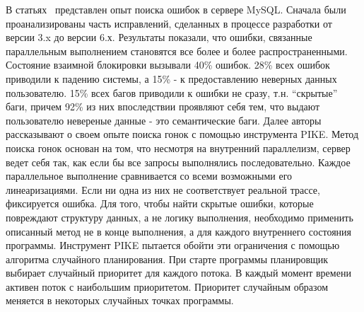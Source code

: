 В статьях~\cite{Fonseca:2010,Fonseca:2011} представлен опыт поиска ошибок в сервере MySQL.
Сначала были проанализированы часть исправлений, сделанных в процессе разработки от версии 3.x до версии 6.х.
Результаты показали, что ошибки, связанные параллельным выполнением становятся все более и более распространенными.
Состояние взаимной блокировки вызывали 40\% ошибок. 28\% всех ошибок приводили к падению системы, а 15\% - к предоставлению неверных данных пользователю.
15\% всех багов приводили к ошибки не сразу, т.н. “скрытые” баги, причем 92\% из них впоследствии проявляют себя тем, что выдают пользователю невереные данные - это семантические баги.
Далее авторы рассказывают о своем опыте поиска гонок с помощью инструмента PIKE.
Метод поиска гонок основан на том, что несмотря на внутренний параллелизм, сервер ведет себя так, как если бы все запросы выполнялись последовательно. 
Каждое параллельное выполнение сравнивается со всеми возможными его линеаризациями. Если ни одна из них не соответствует реальной трассе, фиксируется ошибка. 
Для того, чтобы найти скрытые ошибки, которые повреждают структуру данных, а не логику выполнения, необходимо применить описанный метод не в конце выполнения, а для каждого внутреннего состояния программы.
Инструмент PIKE пытается обойти эти ограничения с помощью алгоритма случайного планирования. При старте программы планировщик выбирает случайный приоритет для каждого потока. В каждый момент времени активен поток с наибольшим приоритетом. Приоритет случайным образом меняется в некоторых случайных точках программы. 

